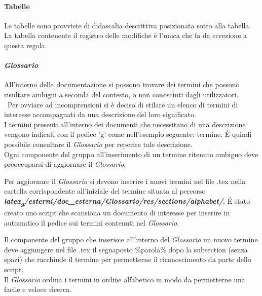 \paragraph{Tabelle} 
Le tabelle sono provviste di didascalia descrittiva posizionata sotto alla tabella. La tabella contenente il registro delle modifiche è l’unica che fa da eccezione a questa regola.

\paragraph{\textit{Glossario}}
All'interno della documentazione si possono trovare dei termini che possono risultare ambigui a seconda del contesto, o non conosciuti dagli utilizzatori.\\\
Per ovviare ad incomprensioni si è deciso di stilare un elenco di termini di interesse accompagnati da una descrizione del loro significato.\\
I termini presenti all'interno dei documenti che necessitano di una descrizione vengono indicati con il pedice 'g' come nell'esempio seguente: termine.
É quindi possibile consultare il \textit{Glossario} per reperire tale descrizione.
\\
Ogni componente del gruppo all'inserimento di un termine ritenuto ambiguo deve preoccuparsi di aggiornare il \textit{Glossario}.

Per aggiornare il \textit{Glossario} si devono inserire i nuovi termini nel file .tex nella cartella corrispondente all'iniziale del termine situata al percorso
\textbf{\textit{latex\textsubscript{g}/esterni/doc\_esterna/\textit{Glossario}/res/sections/alphabet/}}.
É stato creato uno script che scansiona un documento di interesse per inserire in automatico il pedice sui termini contenuti nel \textit{Glossario}.

Il componente del gruppo che inserisce all'interno del \textit{Glossario} un nuovo termine deve aggiungere nel file .tex il segnaposto \%parola\% dopo la subsection (senza spazi) che racchiude il termine per permetterne il riconoscimento da parte dello script.
\\
Il \textit{Glossario} ordina i termini in ordine alfabetico in modo da permetterne una facile e veloce ricerca.